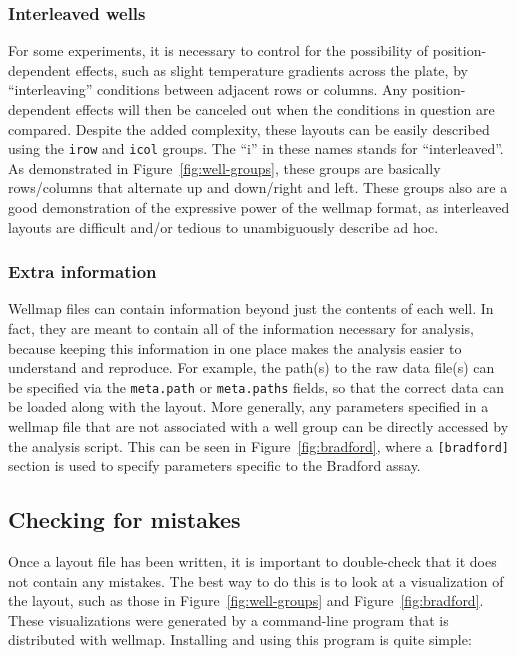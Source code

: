 \documentclass{bmcart}
\begin{document}
\subsubsection*{Interleaved wells}

For some experiments, it is necessary to control for the possibility
of position-dependent effects, such as slight temperature gradients
across the plate, by ``interleaving'' conditions between adjacent
rows or columns. Any position-dependent effects will then be canceled
out when the conditions in question are compared. Despite the added
complexity, these layouts can be easily described using the \texttt{irow}
and \texttt{icol} groups. The ``i'' in these names stands for ``interleaved''.
As demonstrated in Figure~\ref{fig:well-groups}, these groups are
basically rows/columns that alternate up and down/right and left.
These groups also are a good demonstration of the expressive power
of the wellmap format, as interleaved layouts are difficult and/or
tedious to unambiguously describe ad hoc.

\subsubsection*{Extra information}

Wellmap files can contain information beyond just the contents of
each well. In fact, they are meant to contain all of the information
necessary for analysis, because keeping this information in one place
makes the analysis easier to understand and reproduce. For example,
the path(s) to the raw data file(s) can be specified via the \texttt{meta.path}
or \texttt{meta.paths} fields, so that the correct data can be loaded
along with the layout. More generally, any parameters specified in
a wellmap file that are not associated with a well group can be directly
accessed by the analysis script. This can be seen in Figure~\ref{fig:bradford},
where a \texttt{{[}bradford{]}} section is used to specify parameters
specific to the Bradford assay.

\subsection*{Checking for mistakes}

Once a layout file has been written, it is important to double-check
that it does not contain any mistakes. The best way to do this is
to look at a visualization of the layout, such as those in Figure~\ref{fig:well-groups}
and Figure~\ref{fig:bradford}. These visualizations were generated
by a command-line program that is distributed with wellmap. Installing
and using this program is quite simple:
\end{document}
